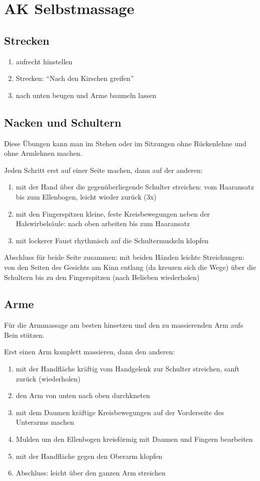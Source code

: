 \section{AK Selbstmassage}
\subsection{Strecken}
\begin{enumerate}
	\item aufrecht hinstellen
	\item Strecken: "`Nach den Kirschen greifen"'
	\item nach unten beugen und Arme baumeln lassen
\end{enumerate}

\subsection{Nacken und Schultern}
Diese Übungen kann man im Stehen oder im Sitzungen ohne Rückenlehne und ohne Armlehnen machen.

Jeden Schritt erst auf einer Seite machen, dann auf der anderen:
\begin{enumerate}
	\item mit der Hand über die gegenüberliegende Schulter streichen: vom Haaransatz bis zum Ellenbogen, leicht wieder zurück (3x)
	\item mit den Fingerspitzen kleine, feste Kreisbewegungen neben der Halswirbelsäule: nach oben arbeiten bis zum Haaransatz
	\item mit lockerer Faust rhythmisch auf die Schultermuskeln klopfen
\end{enumerate}

Abschluss für beide Seite zusammen: mit beiden Händen leichte Streichungen: von den Seiten des Gesichts am Kinn entlang (da kreuzen sich die Wege) über die Schultern bis zu den Fingerspitzen (nach Belieben wiederholen)

\subsection{Arme}
Für die Armmassage am besten hinsetzen und den zu massierenden Arm aufs Bein stützen.

Erst einen Arm komplett massieren, dann den anderen:
\begin{enumerate}
	\item mit der Handfläche kräftig vom Handgelenk zur Schulter streichen, sanft zurück (wiederholen)
	\item den Arm von unten nach oben durchkneten
	\item mit dem Daumen kräftige Kreisbewegungen auf der Vorderseite des Unterarms machen
	\item Mulden um den Ellenbogen kreisförmig mit Daumen und Fingern bearbeiten
	\item mit der Handfläche gegen den Oberarm klopfen
	\item Abschluss: leicht über den ganzen Arm streichen
\end{enumerate}

